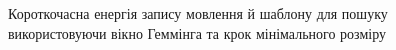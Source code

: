         \begin{figure}[h]
            \centering

            \caption{Короткочасна енергія запису мовлення й шаблону для пошуку використовуючи вікно Геммінга та крок
                мінімального розміру}
            \label{fig:audio-energy-hamming-min}
        \end{figure}

